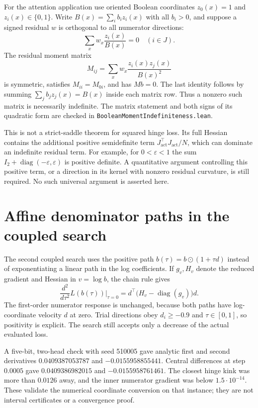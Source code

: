 \documentclass[11pt]{article}
\begin{document}
For the attention application use oriented Boolean coordinates
$z_0(x)=1$ and $z_i(x)\in\{0,1\}$. Write
$B(x)=\sum_i b_i z_i(x)$ with all $b_i>0$, and suppose a signed
residual $w$ is orthogonal to all numerator directions:
\[
 \sum_x w_x\frac{z_i(x)}{B(x)}=0\quad(i\in J).
\]
The residual moment matrix
\[
 M_{ij}=\sum_x w_x\frac{z_i(x)z_j(x)}{B(x)^2}
\]
is symmetric, satisfies $M_{ii}=M_{0i}$, and has $Mb=0$. The last
identity follows by summing $\sum_j b_jz_j(x)=B(x)$ inside each
matrix row. Thus a nonzero such matrix is necessarily indefinite.
The matrix statement and both signs of its quadratic form are checked
in \texttt{BooleanMomentIndefiniteness.lean}.

This is not a strict-saddle theorem for squared hinge loss. Its full
Hessian contains the additional positive semidefinite term
$J_{\mathrm{act}}^{\top}J_{\mathrm{act}}/N$, which can dominate an
indefinite residual term. For example, for $0<\varepsilon<1$ the sum
$I_2+\operatorname{diag}(-\varepsilon,\varepsilon)$ is positive definite.
A quantitative argument controlling this positive term, or a direction
in its kernel with nonzero residual curvature, is still required.
No such universal argument is asserted here.

\section{Affine denominator paths in the coupled search}

The second coupled search uses the positive path
$b(\tau)=b\mathbin{\odot}(1+\tau d)$ instead of exponentiating a
linear path in the log coefficients. If $g_v,H_v$ denote the reduced
gradient and Hessian in $v=\log b$, the chain rule gives
\[
 \frac{d^2}{d\tau^2}L(b(\tau))\bigg|_{\tau=0}
 =d^{\top}\bigl(H_v-\operatorname{diag}(g_v)\bigr)d.
\]
The first-order numerator response is unchanged, because both paths
have log-coordinate velocity $d$ at zero. Trial directions obey
$d_i\ge-0.9$ and $\tau\in[0,1]$, so positivity is explicit.
The search still accepts only a decrease of the actual evaluated loss.

A five-bit, two-head check with seed 510005 gave analytic first and
second derivatives $0.0409387053787$ and $-0.0155958855441$.
Central differences at step $0.0005$ gave $0.0409386982015$ and
$-0.0155958761461$. The closest hinge kink was more than $0.0126$
away, and the inner numerator gradient was below $1.5\cdot10^{-14}$.
These validate the numerical coordinate conversion on that instance;
they are not interval certificates or a convergence proof.
\end{document}

